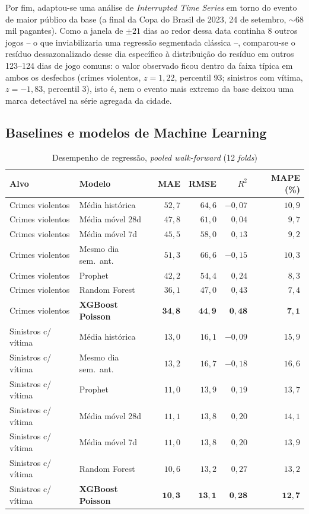\documentclass[12pt]{article}
\begin{document}
Por fim, adaptou-se uma análise de \emph{Interrupted Time Series} em
torno do evento de maior público da base (a final da Copa do Brasil de
2023, 24 de setembro, $\sim$68 mil pagantes). Como a janela de $\pm21$
dias ao redor dessa data continha 8 outros jogos -- o que inviabilizaria
uma regressão segmentada clássica --, comparou-se o resíduo
dessazonalizado desse dia específico à distribuição do resíduo em outros
123--124 dias de jogo comuns: o valor observado ficou dentro da faixa
típica em ambos os desfechos (crimes violentos, $z=1,22$, percentil 93;
sinistros com vítima, $z=-1,83$, percentil 3), isto é, nem o evento mais
extremo da base deixou uma marca detectável na série agregada da cidade.

\subsection{Baselines e modelos de Machine Learning}
\label{sec:validacao}

\begin{table}[ht]
\centering
\caption{Desempenho de regressão, \emph{pooled walk-forward} (12
\emph{folds})}
\label{tab:regressao-completa}
\small
\begin{tabular}{@{}llrrrr@{}}
\toprule
\textbf{Alvo} & \textbf{Modelo} & \textbf{MAE} & \textbf{RMSE} & \textbf{$R^2$} & \textbf{MAPE (\%)} \\
\midrule
Crimes violentos & Média histórica       & $52,7$ & $64,6$ & $-0,07$ & $10,9$ \\
Crimes violentos & Média móvel 28d       & $47,8$ & $61,0$ & $0,04$  & $9,7$  \\
Crimes violentos & Média móvel 7d        & $45,5$ & $58,0$ & $0,13$  & $9,2$  \\
Crimes violentos & Mesmo dia sem.\ ant.  & $51,3$ & $66,6$ & $-0,15$ & $10,3$ \\
Crimes violentos & Prophet               & $42,2$ & $54,4$ & $0,24$  & $8,3$  \\
Crimes violentos & Random Forest         & $36,1$ & $47,0$ & $0,43$  & $7,4$  \\
Crimes violentos & \textbf{XGBoost Poisson} & $\mathbf{34,8}$ & $\mathbf{44,9}$ & $\mathbf{0,48}$ & $\mathbf{7,1}$ \\
\midrule
Sinistros c/ vítima & Média histórica     & $13,0$ & $16,1$ & $-0,09$ & $15,9$ \\
Sinistros c/ vítima & Mesmo dia sem.\ ant.& $13,2$ & $16,7$ & $-0,18$ & $16,6$ \\
Sinistros c/ vítima & Prophet             & $11,0$ & $13,9$ & $0,19$  & $13,7$ \\
Sinistros c/ vítima & Média móvel 28d     & $11,1$ & $13,8$ & $0,20$  & $14,1$ \\
Sinistros c/ vítima & Média móvel 7d      & $11,0$ & $13,8$ & $0,20$  & $13,9$ \\
Sinistros c/ vítima & Random Forest       & $10,6$ & $13,2$ & $0,27$  & $13,2$ \\
Sinistros c/ vítima & \textbf{XGBoost Poisson} & $\mathbf{10,3}$ & $\mathbf{13,1}$ & $\mathbf{0,28}$ & $\mathbf{12,7}$ \\
\bottomrule
\end{tabular}
\end{table}
\end{document}
